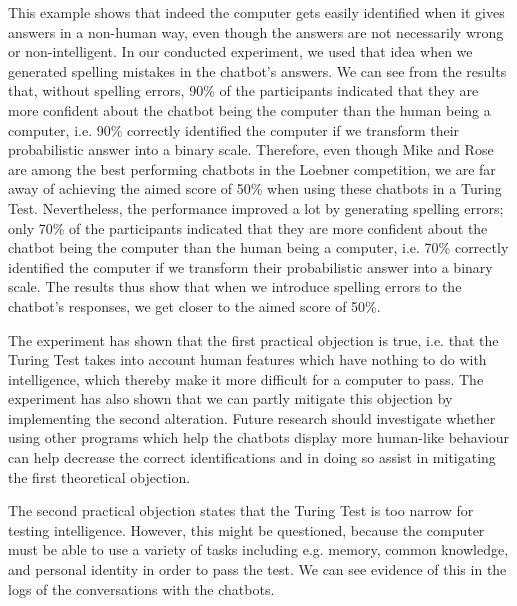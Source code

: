 This example shows that indeed the computer gets easily identified when it gives answers in a non-human way, even though the answers are not necessarily wrong or non-intelligent. In our conducted experiment, we used that idea when we generated spelling mistakes in the chatbot’s answers. We can see from the results that, without spelling errors, 90\% of the participants indicated that they are more confident about the chatbot being the computer than the human being a computer, i.e. 90\% correctly identified the computer if we transform their probabilistic answer into a binary scale. Therefore, even though Mike and Rose are among the best performing chatbots in the Loebner competition, we are far away of achieving the aimed score of 50\% when using these chatbots in a Turing Test. Nevertheless, the performance improved a lot by generating spelling errors; only 70\% of the participants  indicated that they are more confident about the chatbot being the computer than the human being a computer, i.e. 70\% correctly identified the computer if we transform their probabilistic answer into a binary scale. The results thus show that when we introduce spelling errors to the chatbot’s responses, we get closer to the aimed score of 50\%.

The experiment has shown that the first practical objection is true, i.e. that the Turing Test takes into account human features which have nothing to do with intelligence, which thereby make it more difficult for a computer to pass. The experiment has also shown that we can partly mitigate this objection by implementing the second alteration. Future research should investigate whether using other programs which help the chatbots display more human-like behaviour can help decrease the correct identifications and in doing so assist in mitigating the first theoretical objection.

The second practical objection states that the Turing Test is too narrow for testing intelligence. However, this might be questioned, because the computer must be able to use a variety of tasks including e.g. memory, common knowledge, and personal identity in order to pass the test. We can see evidence of this in the logs of the conversations with the chatbots.

\begin{figure}[ht]
   \begin{center}
   \end{center}
   \label{Example5}
\end{figure}

